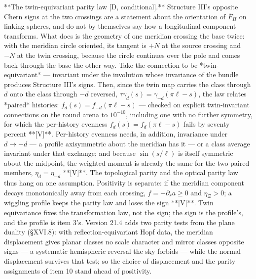 **The twin-equivariant parity law [D, conditional].** Structure III's opposite Chern signs at the two crossings are a statement about the orientation of $\bar F_H$ on linking spheres, and do not by themselves say how a longitudinal component transforms. What does is the geometry of one meridian crossing the base twice: with the meridian circle oriented, its tangent is $+N$ at the source crossing and $-N$ at the twin crossing, because the circle continues over the pole and comes back through the base the other way. Take the connection to be *twin-equivariant* — invariant under the involution whose invariance of the bundle produces Structure III's signs. Then, since the twin map carries the class through $d$ onto the class through $-d$ reversed, $\tau\gamma_d(s) = \gamma_{-d}(\pi\ell-s)$, the law relates *paired* histories: $f_d(s) = f_{-d}(\pi\ell-s)$ — checked on explicit twin-invariant connections on the round arena to $10^{-10}$, including one with no further symmetry, for which the per-history evenness $f_d(s) = f_d(\pi\ell-s)$ fails by seventy percent **[V]**. Per-history evenness needs, in addition, invariance under $d\to-d$ — a profile axisymmetric about the meridian has it — or a class average invariant under that exchange; and because $\sin(s/\ell)$ is itself symmetric about the midpoint, the weighted moment is already the same for the two paired members, $\eta_d = \eta_{-d}$ **[V]**. The topological parity and the optical parity law thus hang on one assumption. Positivity is separate: if the meridian component decays monotonically away from each crossing, $f = -\partial_ra\ge0$ and $\eta_\Xi>0$; a wiggling profile keeps the parity law and loses the sign **[V]**. Twin equivariance fixes the transformation law, not the sign; the sign is the profile's, and the profile is item 3's. Version 21.4 adds two parity tests from the plane duality (§XVI.8): with reflection-equivariant Hopf data, the meridian displacement gives planar classes no scale character and mirror classes opposite signs — a systematic hemispheric reversal the sky forbids — while the normal displacement survives that test; so the choice of displacement and the parity assignments of item 10 stand ahead of positivity.

